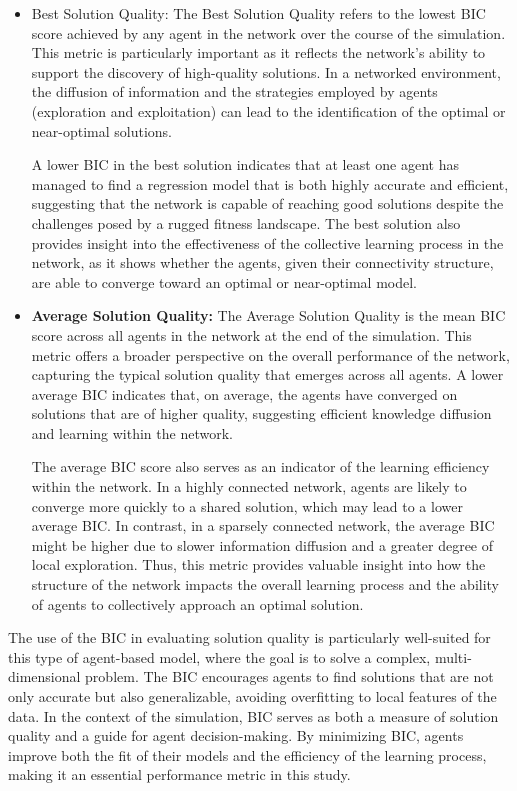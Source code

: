 \documentclass[conference]{IEEEtran}
\begin{document}
\begin{itemize}
\item \textbf{}{Best Solution Quality:} 
The Best Solution Quality refers to the lowest BIC score achieved by any agent in the network over the course of the simulation. This metric is particularly important as it reflects the network's ability to support the discovery of high-quality solutions. In a networked environment, the diffusion of information and the strategies employed by agents (exploration and exploitation) can lead to the identification of the optimal or near-optimal solutions.

A lower BIC in the best solution indicates that at least one agent has managed to find a regression model that is both highly accurate and efficient, suggesting that the network is capable of reaching good solutions despite the challenges posed by a rugged fitness landscape. The best solution also provides insight into the effectiveness of the collective learning process in the network, as it shows whether the agents, given their connectivity structure, are able to converge toward an optimal or near-optimal model.

\item \textbf{Average Solution Quality:}
The Average Solution Quality is the mean BIC score across all agents in the network at the end of the simulation. This metric offers a broader perspective on the overall performance of the network, capturing the typical solution quality that emerges across all agents. A lower average BIC indicates that, on average, the agents have converged on solutions that are of higher quality, suggesting efficient knowledge diffusion and learning within the network.

The average BIC score also serves as an indicator of the learning efficiency within the network. In a highly connected network, agents are likely to converge more quickly to a shared solution, which may lead to a lower average BIC. In contrast, in a sparsely connected network, the average BIC might be higher due to slower information diffusion and a greater degree of local exploration. Thus, this metric provides valuable insight into how the structure of the network impacts the overall learning process and the ability of agents to collectively approach an optimal solution.

\end{itemize}

The use of the BIC in evaluating solution quality is particularly well-suited for this type of agent-based model, where the goal is to solve a complex, multi-dimensional problem. The BIC encourages agents to find solutions that are not only accurate but also generalizable, avoiding overfitting to local features of the data. In the context of the simulation, BIC serves as both a measure of solution quality and a guide for agent decision-making. By minimizing BIC, agents improve both the fit of their models and the efficiency of the learning process, making it an essential performance metric in this study.
\end{document}

